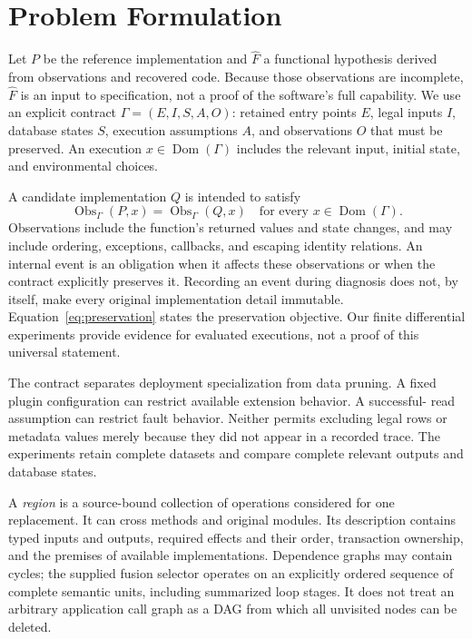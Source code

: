 \documentclass[acmsmall,screen,review,anonymous]{acmart}
\newcommand{\obs}{\operatorname{Obs}}
\newcommand{\dom}{\operatorname{Dom}}
\begin{document}
\section{Problem Formulation}
\label{sec:problem}
Let $P$ be the reference implementation and $\widehat{F}$ a functional
hypothesis derived from observations and recovered code. Because those
observations are incomplete, $\widehat{F}$ is an input to specification, not a
proof of the software's full capability. We use an explicit contract
$\Gamma=(E,I,S,A,O)$: retained entry points $E$, legal inputs $I$, database
states $S$, execution assumptions $A$, and observations $O$ that must be
preserved. An execution $x\in\dom(\Gamma)$ includes the relevant input,
initial state, and environmental choices.

A candidate implementation $Q$ is intended to satisfy
\begin{equation}
  \obs_{\Gamma}(P,x)=\obs_{\Gamma}(Q,x)
  \quad\text{for every }x\in\dom(\Gamma).
  \label{eq:preservation}
\end{equation}
Observations include the function's returned values and state changes, and
may include ordering, exceptions, callbacks, and escaping identity relations.
An internal event is an obligation when it affects these observations or when
the contract explicitly preserves it. Recording an event during diagnosis
does not, by itself, make every original implementation detail immutable.
Equation~\ref{eq:preservation} states the preservation objective. Our finite
differential experiments provide evidence for evaluated executions, not a
proof of this universal statement.

The contract separates deployment specialization from data pruning. A fixed
plugin configuration can restrict available extension behavior. A successful-
read assumption can restrict fault behavior. Neither permits excluding legal
rows or metadata values merely because they did not appear in a recorded
trace. The experiments retain complete datasets and compare complete relevant
outputs and database states.

A \emph{region} is a source-bound collection of operations considered for one
replacement. It can cross methods and original modules. Its description
contains typed inputs and outputs, required effects and their order,
transaction ownership, and the premises of available implementations.
Dependence graphs may contain cycles; the supplied fusion selector operates on an
explicitly ordered sequence of complete semantic units, including summarized
loop stages. It does not treat an arbitrary application call graph as a DAG
from which all unvisited nodes can be deleted.
\end{document}

